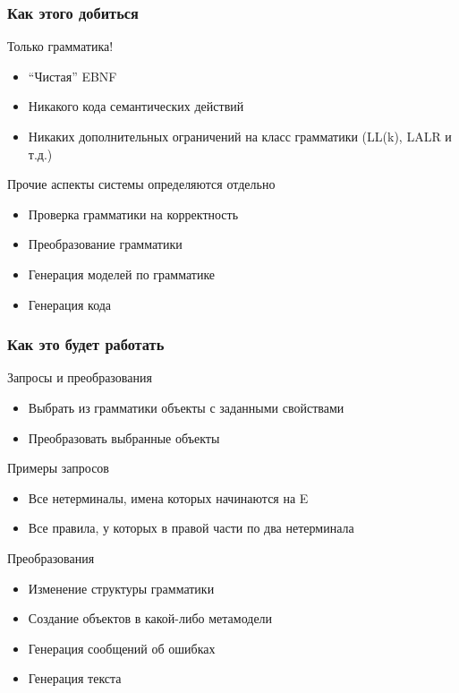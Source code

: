 \documentclass[paper=screen,10pt,unicode]{beamer}
\begin{document}
\begin{frame}
	\frametitle{Как этого добиться}

	\begin{block}{Только грамматика!}
		\begin{itemize}
			\item ``Чистая'' EBNF
			\item Никакого кода семантических действий
			\item Никаких дополнительных ограничений на класс грамматики (LL(k), LALR и т.д.)
		\end{itemize}
	\end{block}
	\begin{block}{Прочие аспекты системы определяются отдельно}
		\begin{itemize}
			\item Проверка грамматики на корректность
			\item Преобразование грамматики
			\item Генерация моделей по грамматике
			\item Генерация кода
		\end{itemize}
	\end{block}
\end{frame}

\begin{frame}
	\frametitle{Как это будет работать}

	\begin{block}{Запросы и преобразования}
		\begin{itemize}
			\item Выбрать из грамматики объекты с заданными свойствами
			\item Преобразовать выбранные объекты
		\end{itemize}
	\end{block}
	\begin{example}{Примеры запросов}
		\begin{itemize}
			\item Все нетерминалы, имена которых начинаются на E
			\item Все правила, у которых в правой части по два нетерминала
		\end{itemize}
	\end{example}
	\begin{block}{Преобразования}
		\begin{itemize}
			\item Изменение структуры грамматики
			\item Создание объектов в какой-либо метамодели
			\item Генерация сообщений об ошибках
			\item Генерация текста
		\end{itemize}
	\end{block}
\end{frame}
\end{document}
